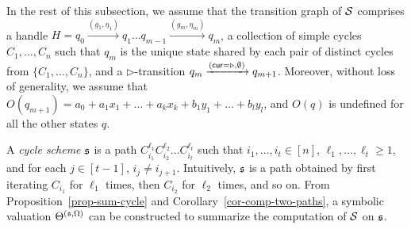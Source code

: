 In the rest of this subsection, we assume that the transition graph of ${\mathcal{S} }$ comprises a handle $H=q_0 \xrightarrow{(g_1,\eta_1)} q_1 \dots q_{m-1} \xrightarrow{(g_m,\eta_m)} q_{m}$, a collection of simple cycles $C_1,\dots,C_n$ such that $q_m$ is the unique state shared by each pair of distinct cycles from $\{C_1,\dots,C_n\}$, and a $\triangleright$-transition $q_m \xrightarrow{(\mathsf{cur} = \triangleright, \emptyset)} q_{m+1}$. Moreover, without loss of generality, we assume that $O(q_{m+1}) = a_0 + a_1 x_1 + \dots + a_k x_k + b_1 y_1 + \dots + b_l y_l$, and $O(q)$ is undefined for all the other states $q$.

A \emph{cycle scheme} ${\mathfrak{s} }$ is a path $C_{i_1}^{\ell_1} C_{i_2}^{\ell_2} \dots C_{i_t}^{\ell_t}$ such that $i_1,\dots,i_t \in [n]$, $\ell_1,\dots, \ell_t \ge 1$, and for each $j\in [t-1]$, $i_j \neq i_{j+1}$. Intuitively, ${\mathfrak{s} }$ is a path obtained by first iterating $C_{i_1}$ for $\ell_1$ times, then $C_{i_2}$ for $\ell_2$ times, and so on. From Proposition~\ref{prop-sum-cycle} and Corollary~\ref{cor-comp-two-paths}, a symbolic valuation $\Theta^{({\mathfrak{s} },\Omega)}$ can be constructed 
to summarize the computation of ${\mathcal{S} }$ on ${\mathfrak{s} }$. 


